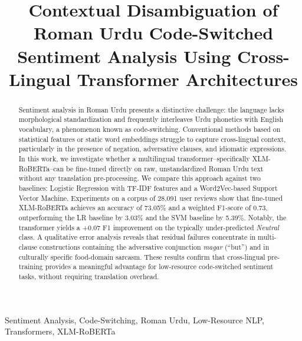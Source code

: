 \documentclass[conference]{IEEEtran}
\begin{document}
\title{Contextual Disambiguation of Roman Urdu Code-Switched Sentiment Analysis Using Cross-Lingual Transformer Architectures}

\author{

}

\maketitle

\begin{abstract}
Sentiment analysis in Roman Urdu presents a distinctive challenge: the language lacks morphological standardization and frequently interleaves Urdu phonetics with English vocabulary, a phenomenon known as code-switching. Conventional methods based on statistical features or static word embeddings struggle to capture cross-lingual context, particularly in the presence of negation, adversative clauses, and idiomatic expressions. In this work, we investigate whether a multilingual transformer--specifically XLM-RoBERTa--can be fine-tuned directly on raw, unstandardized Roman Urdu text without any translation pre-processing. We compare this approach against two baselines: Logistic Regression with TF-IDF features and a Word2Vec-based Support Vector Machine. Experiments on a corpus of 28,091 user reviews show that fine-tuned XLM-RoBERTa achieves an accuracy of 73.05\% and a weighted F1-score of 0.73, outperforming the LR baseline by 3.03\% and the SVM baseline by 5.39\%. Notably, the transformer yields a +0.07 F1 improvement on the typically under-predicted \textit{Neutral} class. A qualitative error analysis reveals that residual failures concentrate in multi-clause constructions containing the adversative conjunction \textit{magar} (``but'') and in culturally specific food-domain sarcasm. These results confirm that cross-lingual pre-training provides a meaningful advantage for low-resource code-switched sentiment tasks, without requiring translation overhead.
\end{abstract}

\begin{IEEEkeywords}
Sentiment Analysis, Code-Switching, Roman Urdu, Low-Resource NLP, Transformers, XLM-RoBERTa
\end{IEEEkeywords}
\end{document}
